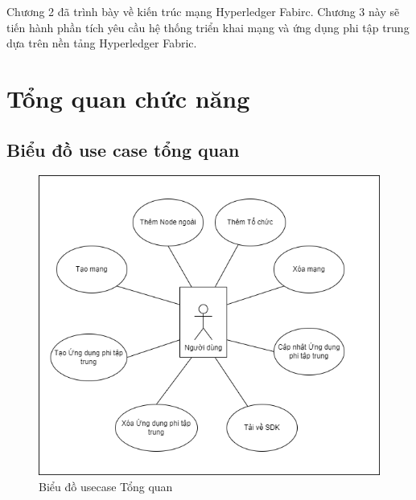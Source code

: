 \documentclass[../DoAn.tex]{subfiles}
\begin{document}
Chương 2 đã trình bày về kiến trúc mạng Hyperledger Fabirc. Chương 3 này sẽ
tiến hành phần tích yêu cầu hệ thống triển khai mạng và ứng dụng phi tập trung
dựa trên nền tảng Hyperledger Fabric.



\section{Tổng quan chức năng}
\label{section:2.2}

\subsection{Biểu đồ use case tổng quan}
\label{subsection:2.2.1}

\begin{figure}[h]
  \centering
  \includegraphics[width=0.75\linewidth]{Hinhve/DoAn-usecase.drawio.png}
  \caption[Biểu đồ usecase Tổng quan]{Biểu đồ usecase Tổng quan}
  \label{fig:general_usecase}
\end{figure}
\end{document}
